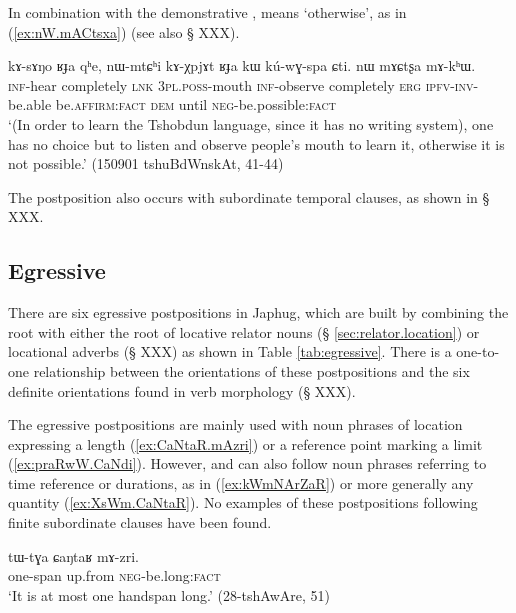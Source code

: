 In combination with the demonstrative ,  means `otherwise', as in (\ref{ex:nW.mACtsxa}) (see also § XXX).

\begin{exe}
\ex \label{ex:nW.mACtsxa}
 \gll   kɤ-sɤŋo ʁɟa qʰe,  nɯ-mtɕʰi kɤ-χpjɤt ʁɟa kɯ kú-wɣ-spa ɕti.  nɯ mɤɕtʂa mɤ-kʰɯ. \\
 \textsc{inf}-hear completely \textsc{lnk} \textsc{3pl}.\textsc{poss}-mouth \textsc{inf}-observe completely \textsc{erg} \textsc{ipfv}-\textsc{inv}-be.able be.\textsc{affirm}:\textsc{fact} \textsc{dem} until \textsc{neg}-be.possible:\textsc{fact} \\
\glt `(In order to learn the Tshobdun language, since it has no writing system), one has no choice but to listen and observe people's mouth to learn it, otherwise it is not possible.' (150901 tshuBdWnskAt, 41-44)
\end{exe}

The postposition  also occurs with subordinate temporal clauses, as shown in § XXX.

\subsection{Egressive} \label{sec:egressive}  
There are six egressive postpositions in Japhug, which are built by combining the root  with either the root of locative relator nouns (§ \ref{sec:relator.location}) or locational adverbs (§ XXX) as shown in Table \ref{tab:egressive}. There is a one-to-one relationship between the orientations of these postpositions and the six definite orientations found in verb morphology (§ XXX).

The egressive postpositions are mainly used with noun phrases of location expressing a length (\ref{ex:CaNtaR.mAzri}) or a reference point marking a limit (\ref{ex:praRwW.CaNdi}). However,  and  can also follow noun phrases referring to time reference or durations, as in (\ref{ex:kWmNArZaR}) or more generally any quantity (\ref{ex:XsWm.CaNtaR}). No examples of these postpositions following finite subordinate clauses have been found.

\begin{exe}
\ex \label{ex:CaNtaR.mAzri}
 \gll  tɯ-tɣa ɕaŋtaʁ mɤ-zri. \\
 one-span up.from \textsc{neg}-be.long:\textsc{fact} \\
 \glt `It is at most one handspan long.' (28-tshAwAre, 51)
 \end{exe}
 
